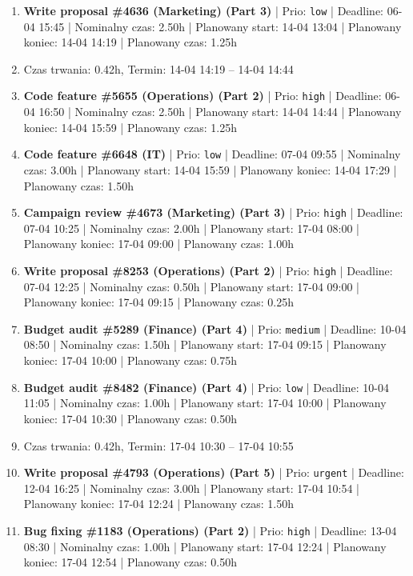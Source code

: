 {\begin{enumerate}
  \item [\textbf{14684}] \textbf{Write proposal \#4636 (Marketing) (Part 3)} | Prio: \texttt{low} | Deadline: 06-04 15:45 | Nominalny czas: 2.50h | Planowany start: 14-04 13:04 | Planowany koniec: 14-04 14:19 | Planowany czas: 1.25h
  \item [\textbf{PRZERWA}] Czas trwania: 0.42h, Termin: 14-04 14:19 -- 14-04 14:44
  \item [\textbf{14626}] \textbf{Code feature \#5655 (Operations) (Part 2)} | Prio: \texttt{high} | Deadline: 06-04 16:50 | Nominalny czas: 2.50h | Planowany start: 14-04 14:44 | Planowany koniec: 14-04 15:59 | Planowany czas: 1.25h
  \item [\textbf{14683}] \textbf{Code feature \#6648 (IT)} | Prio: \texttt{low} | Deadline: 07-04 09:55 | Nominalny czas: 3.00h | Planowany start: 14-04 15:59 | Planowany koniec: 14-04 17:29 | Planowany czas: 1.50h
  \item [\textbf{14625}] \textbf{Campaign review \#4673 (Marketing) (Part 3)} | Prio: \texttt{high} | Deadline: 07-04 10:25 | Nominalny czas: 2.00h | Planowany start: 17-04 08:00 | Planowany koniec: 17-04 09:00 | Planowany czas: 1.00h
  \item [\textbf{14614}] \textbf{Write proposal \#8253 (Operations) (Part 2)} | Prio: \texttt{high} | Deadline: 07-04 12:25 | Nominalny czas: 0.50h | Planowany start: 17-04 09:00 | Planowany koniec: 17-04 09:15 | Planowany czas: 0.25h
  \item [\textbf{14630}] \textbf{Budget audit \#5289 (Finance) (Part 4)} | Prio: \texttt{medium} | Deadline: 10-04 08:50 | Nominalny czas: 1.50h | Planowany start: 17-04 09:15 | Planowany koniec: 17-04 10:00 | Planowany czas: 0.75h
  \item [\textbf{14694}] \textbf{Budget audit \#8482 (Finance) (Part 4)} | Prio: \texttt{low} | Deadline: 10-04 11:05 | Nominalny czas: 1.00h | Planowany start: 17-04 10:00 | Planowany koniec: 17-04 10:30 | Planowany czas: 0.50h
  \item [\textbf{PRZERWA}] Czas trwania: 0.42h, Termin: 17-04 10:30 -- 17-04 10:55
  \item [\textbf{14600}] \textbf{Write proposal \#4793 (Operations) (Part 5)} | Prio: \texttt{urgent} | Deadline: 12-04 16:25 | Nominalny czas: 3.00h | Planowany start: 17-04 10:54 | Planowany koniec: 17-04 12:24 | Planowany czas: 1.50h
  \item [\textbf{14613}] \textbf{Bug fixing \#1183 (Operations) (Part 2)} | Prio: \texttt{high} | Deadline: 13-04 08:30 | Nominalny czas: 1.00h | Planowany start: 17-04 12:24 | Planowany koniec: 17-04 12:54 | Planowany czas: 0.50h

\end{enumerate}}
